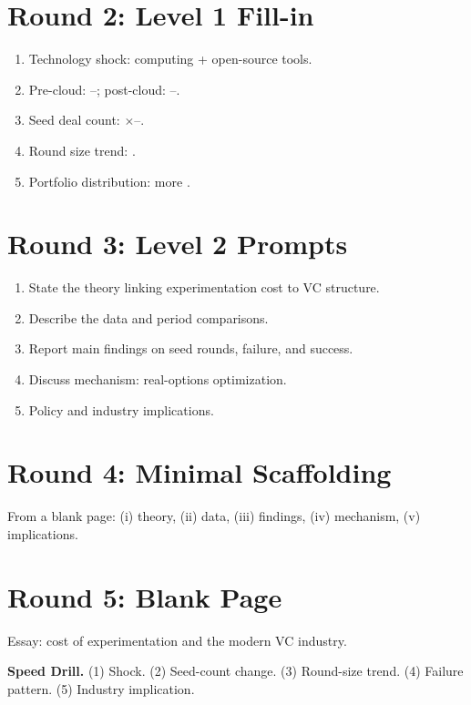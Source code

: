 \documentclass[11pt]{article}
\newcommand{\blank}[1]{\underline{\hspace{#1}}}
\begin{document}
\section*{Round 2: Level 1 Fill-in}
\begin{enumerate}
\item Technology shock: \blank{2cm} computing + open-source tools.
\item Pre-cloud: \blank{1cm}--\blank{1cm}; post-cloud: \blank{1cm}--\blank{1cm}.
\item Seed deal count: $\times$\blank{1cm}--\blank{1cm}.
\item Round size trend: \blank{2cm}.
\item Portfolio distribution: more \blank{2cm}.
\end{enumerate}

\section*{Round 3: Level 2 Prompts}
\begin{enumerate}
\item State the theory linking experimentation cost to VC structure.
\item Describe the data and period comparisons.
\item Report main findings on seed rounds, failure, and success.
\item Discuss mechanism: real-options optimization.
\item Policy and industry implications.
\end{enumerate}

\section*{Round 4: Minimal Scaffolding}
From a blank page: (i) theory, (ii) data, (iii) findings, (iv) mechanism, (v) implications.

\section*{Round 5: Blank Page}
Essay: cost of experimentation and the modern VC industry.

\vspace{6pt}
\begin{drillbox}
\textbf{Speed Drill.} (1) Shock. (2) Seed-count change. (3) Round-size trend. (4) Failure pattern. (5) Industry implication.
\end{drillbox}
\end{document}
